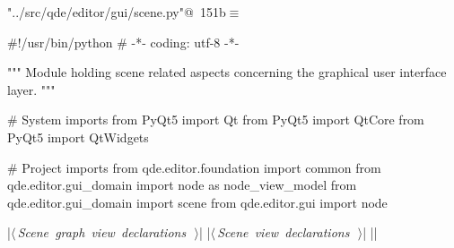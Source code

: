\documentclass[%
    a4paper,    %
    justified,  %
    nobib,      %
    openany     %
]{tufte-book}
\begin{document}
\begin{flushleft} \small
\begin{minipage}{\linewidth}\label{scrap174}\raggedright\small
{} \verb@"../src/qde/editor/gui/scene.py"@\nobreak\ {\footnotesize {151b}}$\equiv$
\vspace{-1ex}
\begin{pythoncode}
#!/usr/bin/python
# -*- coding: utf-8 -*-

""" Module holding scene related aspects concerning the graphical user interface layer.
"""

# System imports
from PyQt5 import Qt
from PyQt5 import QtCore
from PyQt5 import QtWidgets

# Project imports
from qde.editor.foundation import common
from qde.editor.gui_domain import node as node_view_model
from qde.editor.gui_domain import scene
from qde.editor.gui import node

|\hbox{$\langle\,${\itshape Scene graph view declarations}\nobreak\ {\footnotesize {}}$\,\rangle$}|
|\hbox{$\langle\,${\itshape Scene view declarations}\nobreak\ {\footnotesize {}}$\,\rangle$}|
|\NWsep|
\end{pythoncode}
\vspace{1.5ex}
\footnotesize
\begin{list}{}{\setlength{\itemsep}{-\parsep}\setlength{\itemindent}{-\leftmargin}}

\item{}
\end{list}
\end{minipage}\vspace{4ex}
\end{flushleft}
\end{document}
